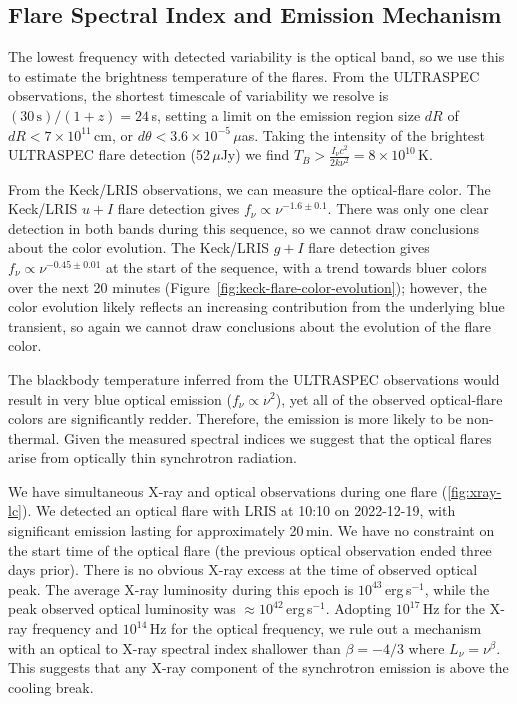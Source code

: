 \documentclass{nature_plusfigure}
\begin{document}
\begin{methods}
\section{Flare Spectral Index and Emission Mechanism}
\label{sec:flare-emission-mechanism}

The lowest frequency with detected variability is the optical band, so we use this to estimate the brightness temperature of the flares.
From the ULTRASPEC observations, the shortest timescale of variability we resolve is $(30\,\mathrm{s})/(1+z) = 24\,$s, setting a limit on the emission region size $dR$ of $dR<7\times10^{11}\,$cm, or $d\theta < 3.6 \times 10^{-5}\,\mu$as. Taking the intensity of the brightest ULTRASPEC flare detection (52\,$\mu$Jy) we find $T_B > \frac{I_\nu c^2}{2 k\nu^2} = 8\times10^{10}\,$K.

From the Keck/LRIS observations, we can measure the optical-flare color. The Keck/LRIS $u+I$ flare detection gives $f_\nu \propto \nu^{-1.6\pm0.1}$. There was only one clear detection in both bands during this sequence, so we cannot draw conclusions about the color evolution. The Keck/LRIS $g+I$ flare detection gives $f_\nu \propto \nu^{-0.45\pm0.01}$ at the start of the sequence, with a trend towards bluer colors over the next 20 minutes (Figure~\ref{fig:keck-flare-color-evolution}); however, the color evolution likely reflects an increasing contribution from the underlying blue transient, so again we cannot draw conclusions about the evolution of the flare color.

The blackbody temperature inferred from the ULTRASPEC observations would result in very blue optical emission ($f_\nu\propto\nu^2$), yet all of the observed optical-flare colors are significantly redder. Therefore, the emission is more likely to be non-thermal. Given the measured spectral indices we suggest that the optical flares arise from optically thin synchrotron radiation. 

We have simultaneous X-ray and optical observations during one flare (\ref{fig:xray-lc}). We detected an optical flare with LRIS at 10:10 on 2022-12-19, with significant emission lasting for approximately 20\,min. We have no constraint on the start time of the optical flare (the previous optical observation ended three days prior). There is no obvious X-ray excess at the time of observed optical peak. The average X-ray luminosity during this epoch is $10^{43}\,$erg\,s$^{-1}$, while the peak observed optical luminosity was $\approx 10^{42}$\,erg\,s$^{-1}$.
Adopting $10^{17}\,$Hz for the X-ray frequency and $10^{14}\,$Hz for the optical frequency, we rule out a mechanism with an optical to X-ray spectral index shallower than $\beta=-4/3$ where $L_\nu = \nu^{\beta}$. This suggests that any X-ray component of the synchrotron emission is above the cooling break.


\end{methods}
\end{document}
